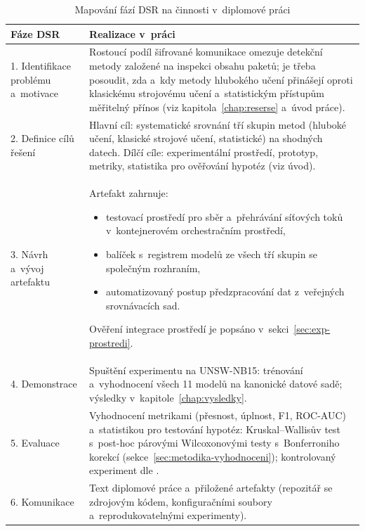 \begin{table}[htbp]
\centering
\caption[Mapování fází DSR na činnosti v~diplomové práci]{Mapování fází DSR \parencite{Peffers2007} na činnosti v~diplomové práci}
\label{tab:dsrfaze}
\small
\begin{tabular}{p{3.5cm}p{8.5cm}}
\toprule
Fáze DSR & Realizace v~práci \\
\midrule
1. Identifikace problému a~motivace &
Rostoucí podíl šifrované komunikace omezuje detekční metody založené na inspekci obsahu paketů; je třeba posoudit, zda a~kdy metody hlubokého učení přinášejí oproti klasickému strojovému učení a~statistickým přístupům měřitelný přínos (viz kapitola~\ref{chap:reserse} a~úvod práce). \\[4pt]
2. Definice cílů řešení &
Hlavní cíl: systematické srovnání tří skupin metod (hluboké učení, klasické strojové učení, statistické) na shodných datech.\newline
Dílčí cíle: experimentální prostředí, prototyp, metriky, statistika pro ověřování hypotéz (viz úvod). \\[4pt]
3. Návrh a~vývoj artefaktu &
Artefakt zahrnuje:
\begin{itemize}[nosep,leftmargin=1.2em]
\item testovací prostředí pro sběr a~přehrávání síťových toků v~kontejnerovém orchestračním prostředí,
\item balíček s~registrem modelů ze všech tří skupin se společným rozhraním,
\item automatizovaný postup předzpracování dat z~veřejných srovnávacích sad.
\end{itemize}
Ověření integrace prostředí je popsáno v~sekci~\ref{sec:exp-prostredi}. \\[4pt]
4. Demonstrace &
Spuštění experimentu na UNSW-NB15: trénování a~vyhodnocení všech 11 modelů na kanonické datové sadě; výsledky v~kapitole~\ref{chap:vysledky}. \\[4pt]
5. Evaluace &
Vyhodnocení metrikami (přesnost, úplnost, F1, ROC-AUC) a~statistikou pro testování hypotéz: Kruskal--Wallisův test s~post-hoc párovými Wilcoxonovými testy s~Bonferroniho korekcí (sekce~\ref{sec:metodika-vyhodnoceni}); kontrolovaný experiment dle \textcite{Wohlin2012}. \\[4pt]
6. Komunikace &
Text diplomové práce a~přiložené artefakty (repozitář se zdrojovým kódem, konfiguračními soubory a~reprodukovatelnými experimenty). \\
\bottomrule
\end{tabular}
\end{table}

